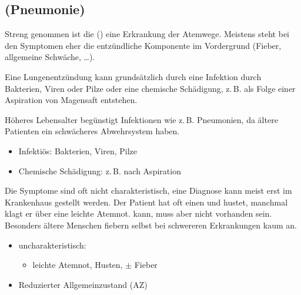 \subsection{ (Pneumonie)}
\label{topic:pneumonie}
\label{topic:lungenentzuendung}

Streng genommen ist die   () eine Erkrankung der
Atemwege. Meistens steht bei den Symptomen eher die
entzündliche Komponente im Vordergrund (Fieber, allgemeine
Schwäche, \ldots).

{%
Eine Lungenentzündung kann grundsätzlich durch eine
Infektion durch Bakterien, Viren oder
Pilze oder eine
chemische Schädigung, z.\,B. als Folge einer Aspiration von
Magensaft
   entstehen.

Höheres Lebensalter begünstigt Infektionen wie z.\,B.
Pneumonien, da ältere Patienten ein schwächeres Abwehrsystem
haben.
}{
\begin{itemize}
  \item Infektiös: Bakterien, Viren, Pilze
  \item Chemische Schädigung: z.\,B. nach
  Aspiration
\end{itemize}
}{}{}{}


\TextSlide{\TxSymptome}
{%
Die Symptome sind oft nicht charakteristisch, eine Diagnose
kann meist erst im Krankenhaus gestellt werden. Der Patient
hat oft einen  und hustet,
manchmal klagt er über eine leichte Atemnot. 
kann, muss aber nicht vorhanden sein. Besonders ältere
Menschen fiebern selbst bei schwereren Erkrankungen kaum an.

\bigskip
}{
\begin{itemize}
  \item uncharakteristisch:
  \begin{itemize}
    \item leichte Atemnot, Husten,  $\pm$ Fieber
  \end{itemize}
  \item Reduzierter Allgemeinzustand (AZ)
\end{itemize}
}{}{}{}




